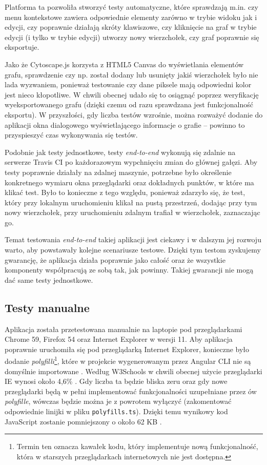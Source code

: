 Platforma ta pozwoliła stworzyć testy automatyczne, które sprawdzają m.in. czy menu kontekstowe zawiera odpowiednie elementy zarówno w trybie widoku jak i edycji, czy poprawnie działają skróty klawiszowe, czy kliknięcie na graf w trybie edycji (i tylko w trybie edycji) utworzy nowy wierzchołek, czy graf poprawnie się eksportuje. 

Jako że Cytoscape.js korzysta z HTML5 Canvas do wyświetlania elementów grafu, sprawdzenie czy np. został dodany lub usunięty jakiś wierzchołek było nie lada wyzwaniem, ponieważ testowanie czy dane piksele mają odpowiedni kolor jest nieco kłopotliwe. W chwili obecnej udało się to osiągnąć poprzez weryfikację wyeksportowanego grafu (dzięki czemu od razu sprawdzana jest funkcjonalność eksportu). W przyszłości, gdy liczba testów wzrośnie, można rozważyć dodanie do aplikacji okna dialogowego wyświetlającego informacje o grafie -- powinno to przyspieszyć czas wykonywania się testów.

Podobnie jak testy jednostkowe, testy \textit{end-to-end} wykonują się zdalnie na serwerze Travis CI po każdorazowym wypchnięciu zmian do głównej gałęzi. Aby testy poprawnie działały na zdalnej maszynie, potrzebne było określenie konkretnego wymiaru okna przeglądarki oraz dokładnych punktów, w które ma klikać test. Było to konieczne z tego względu, ponieważ zdarzyło się, że test, który przy lokalnym uruchomieniu klikał na pustą przestrzeń, dodając przy tym nowy wierzchołek, przy uruchomieniu zdalnym trafiał w wierzchołek, zaznaczając go. 

Temat testowania \textit{end-to-end} takiej aplikacji jest ciekawy i w dalszym jej rozwoju warto, aby powstawały kolejne scenariusze testowe. Dzięki tym testom zyskujemy gwarancję, że aplikacja działa poprawnie jako całość oraz że wszystkie komponenty współpracują ze sobą tak, jak powinny. Takiej gwarancji nie mogą dać same testy jednostkowe. 

\subsection*{Testy manualne}

Aplikacja została przetestowana manualnie na laptopie pod przeglądarkami Chrome 59, Firefox 54 oraz Internet Explorer w wersji 11. Aby aplikacja poprawnie uruchomiła się pod przeglądarką Internet Explorer, konieczne było dodanie \textit{polyfilli}\footnote{Termin ten oznacza kawałek kodu, który implementuje nową funkcjonalność, która w starszych przeglądarkach internetowych nie jest dostępna.}, które w projekcie wygenerowanym przez Angular CLI nie są domyślnie importowane \cite{duveau}. Według W3Schools w chwili obecnej użycie przeglądarki IE wynosi około 4,6\% \cite{w3schools}. Gdy liczba ta będzie bliska zeru oraz gdy nowe przeglądarki będą w pełni implementować funkcjonalności uzupełniane przez ów \textit{polyfille}, wówczas będzie można je z powrotem wyłączyć (zakomentować odpowiednie linijki w pliku \texttt{polyfills.ts}). Dzięki temu wynikowy kod JavaScript zostanie pomniejszony o około 62 KB \cite{angular-browser-support}. 

